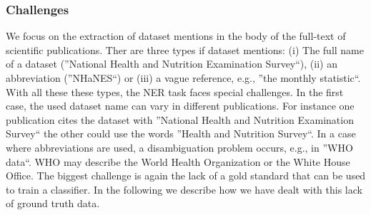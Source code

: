\subsubsection{Challenges}
We focus on the extraction of dataset mentions in the body of the full-text of scientific publications.
Ther are three types if dataset mentions:
(i) The full name of a dataset (''National Health and Nutrition Examination Survey``),
(ii) an abbreviation (''NHaNES``) or (iii) a vague reference, e.g., ''the monthly statistic``.
With all these these types, the NER task faces special challenges.
In the first case, the used dataset name can vary in different publications.
For instance one publication cites the dataset with ''National Health and Nutrition Examination Survey`` the other could use the words  ''Health and Nutrition Survey``.
In a case where abbreviations are used, a disambiguation problem occurs, e.g., in ''WHO data``. WHO may describe the World Health Organization or the White House Office.
The biggest challenge is again the lack of a gold standard that can be used to train a classifier.
In the following we describe how we have dealt with this lack of ground truth data.

